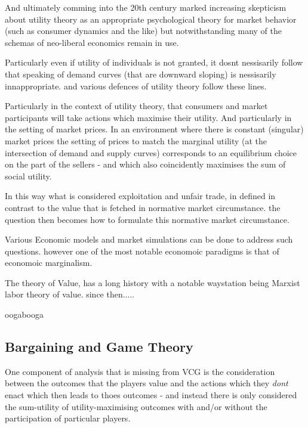 And ultimately comming into the 20th century marked increasing skepticism about utility theory as an appropriate psychological theory for market behavior (such as consumer dynamics and the like) but notwithstanding many of the schemas of neo-liberal economics remain in use.

Particularly even if utility of individuals is not granted, it dosnt nessisarily follow that speaking of demand curves (that are downward sloping) is nessisarily innappropriate. and various defences of utility theory follow these lines.

Particularly in the context of utility theory, that consumers and market participants will take actions which maximise their utility.
And particularly in the setting of market prices.
In an environment where there is constant (singular) market prices the setting of prices to match the marginal utility (at the intersection of demand and supply curves) corresponds to an equilibrium choice on the part of the sellers - and which also coincidently maximises the sum of social utility.






 




In this way what is considered exploitation and unfair trade, in defined in contrast to the value that is fetched in normative market circumstance.
the question then becomes how to formulate this normative market circumstance.

Various Economic models and market simulations can be done to address such questions.
however one of the most notable economoic paradigms is that of economoic marginalism.

The theory of Value, has a long history with a notable waystation being Marxist labor theory of value. since then.....

oogabooga


\subsection{Bargaining and Game Theory}\label{sec:solutions_bargaining}

One component of analysis that is missing from VCG is the consideration between the outcomes that the players value and the actions which they \textit{dont} enact which then leads to thoes outcomes - and instead there is only considered the sum-utility of utility-maximising outcomes with and/or without the participation of particular players.

